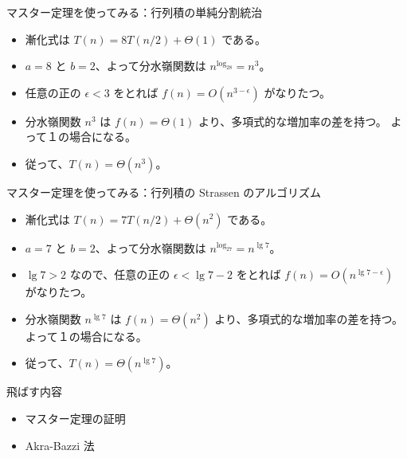 \documentclass[unicode,11pt,aspectratio=169,notes]{beamer} %
\begin{document}
\begin{frame}{マスター定理を使ってみる：行列積の単純分割統治}
  \begin{itemize}
    \item<+-> 漸化式は $T(n)=8T(n/2)+\Theta(1)$ である。
    \item<+-> $a=8$ と $b=2$、よって分水嶺関数は $n^{\log_28}=n^3$。
    \item<+-> 任意の正の $\epsilon<3$ をとれば $f(n)=O(n^{3-\epsilon})$ がなりたつ。
    \item<+-> 分水嶺関数 $n^3$ は $f(n)=\Theta(1)$ より、多項式的な増加率の差を持つ。
    よって１の場合になる。
    \item<+-> 従って、$T(n)=\Theta(n^3)$。
  \end{itemize}
\end{frame}

\begin{frame}{マスター定理を使ってみる：行列積の Strassen のアルゴリズム}
  \begin{itemize}
    \item<+-> 漸化式は $T(n)=7T(n/2)+\Theta(n^2)$ である。
    \item<+-> $a=7$ と $b=2$、よって分水嶺関数は $n^{\log_27}=n^{\lg 7}$。
    \item<+-> $\lg 7 > 2$ なので、任意の正の $\epsilon<\lg 7-2$ をとれば $f(n)=O(n^{\lg 7-\epsilon})$ がなりたつ。
    \item<+-> 分水嶺関数 $n^{\lg 7}$ は $f(n)=\Theta(n^2)$ より、多項式的な増加率の差を持つ。
    よって１の場合になる。
    \item<+-> 従って、$T(n)=\Theta(n^{\lg 7})$。
  \end{itemize}
\end{frame}

\begin{frame}{飛ばす内容}
  \begin{itemize}
    \item マスター定理の証明
    \item Akra-Bazzi 法
  \end{itemize}
\end{frame}
\end{document}
